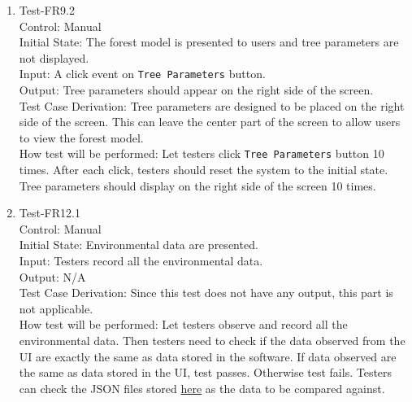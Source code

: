 \documentclass[12pt, titlepage]{article}
\begin{document}
\begin{enumerate}
\item{Test-FR9.2\\}
Control: Manual\\ 

Initial State: The forest model is presented to users and 
tree parameters are not displayed.\\

Input: A click event on \verb|Tree Parameters| button.\\

Output: Tree parameters should appear on the right side of the 
screen.\\

Test Case Derivation: Tree parameters are designed to be placed
on the right side of the screen. This can leave the center part 
of the screen to allow users to view the forest model.\\
					
How test will be performed: Let testers click 
\verb|Tree Parameters| button 10 times. After each click, testers 
should reset the system to the initial state. Tree parameters
should display on the right side of the screen 10 times.

\item{Test-FR12.1\\}
Control: Manual\\ 

Initial State: Environmental data are presented.\\

Input: Testers record all the environmental data.\\

Output: N/A\\

Test Case Derivation: Since this test does not have any output, this 
part is not applicable.\\
					
How test will be performed: Let testers observe and record all the 
environmental data. Then testers need to check if the data observed
from the UI are exactly the same as data stored in the software. 
If data observed are the same as data stored in the UI, test passes.
Otherwise test fails. Testers can check the JSON files stored 
\href{https://github.com/tingyushi/DTForest-DS}{here}
as the data to be compared against. 


\end{enumerate}
\end{document}
